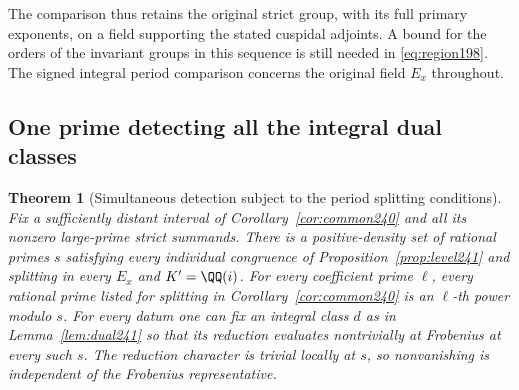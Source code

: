 \documentclass[a4paper,11pt]{article}
\newtheorem{theorem}[proposition]{Theorem}
\theoremstyle{definition}
\theoremstyle{remark}
\numberwithin{equation}{section}
\begin{document}
The comparison thus retains the original strict group, with
its full primary exponents, on a field supporting the stated
cuspidal adjoints. A bound for the orders of the invariant
groups in this sequence is still needed in \eqref{eq:region198}.
The signed integral period comparison concerns the original
field \(E_x\) throughout.

\subsection{One prime detecting all the integral dual classes}\label{nav:II-46}
\begin{theorem}[Simultaneous detection subject to the period splitting conditions]
\label{thm:detect241}
Fix a sufficiently distant interval of Corollary~\ref{cor:common240}
and all its nonzero large-prime strict summands. There is a
positive-density set of rational primes \(s\) satisfying every
individual congruence of Proposition~\ref{prop:level241} and
splitting in every \(E_x\) and \(K'=\QQ(i)\). For every
coefficient prime \(\ell\), every rational prime listed for
splitting in Corollary~\ref{cor:common240} is an \(\ell\)-th
power modulo \(s\). For every datum one can fix an integral
class \(d\) as in Lemma~\ref{lem:dual241} so that its
reduction evaluates nontrivially at Frobenius at every such
\(s\). The reduction character is trivial locally at \(s\),
so nonvanishing is independent of the Frobenius representative.
\end{theorem}
\end{document}
